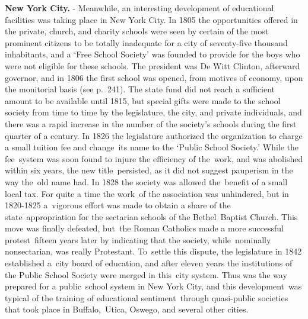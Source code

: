 \documentclass[
]{book}
\begin{document}
\textbf{New York City.} - Meanwhile, an interesting development of educational facilities was taking place in New York City. In 1805 the opportunities offered in the private, church, and charity schools were seen by certain of the most prominent citizens to be totally inadequate for a city of seventy-five thousand inhabitants, and a `Free School Society' was founded to provide for the boys who were not eligible for these schools. The president was De Witt Clinton, afterward governor, and in 1806 the first school was opened, from motives of economy, upon the monitorial basis (see p.~241). The state fund did not reach a sufficient amount to be available until 1815, but special gifts were made to the school society from time to time by the legislature, the city, and private individuals, and there was a rapid increase in the number of the society's schools during the first quarter of a century. In 1826 the legislature authorized the organization to charge a small tuition fee and change~its name to the `Public School Society.' While the fee~system was soon found to injure the efficiency of the~work, and was abolished within six years, the new title~persisted, as it did not suggest pauperism in the way the~old name had. In 1828 the society was allowed the~benefit of a small local tax. For quite a time the work~of the association was unhindered, but in 1820-1825 a~vigorous effort was made to obtain a share of the state~appropriation for the sectarian schools of the Bethel~Baptist Church. This move was finally defeated, but~the Roman Catholics made a more successful protest~fifteen years later by indicating that the society, while~nominally nonsectarian, was really Protestant. To~settle this dispute, the legislature in 1842 established a~city board of education, and after eleven years the institutions of the Public School Society were merged in this~city system. Thus was the way prepared for a public~school system in New York City, and this development~was typical of the training of educational sentiment~through quasi-public societies that took place in Buffalo,~Utica, Oswego, and several other cities.
\end{document}
